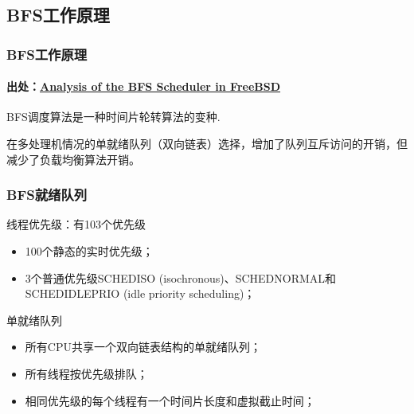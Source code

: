 \subsection{BFS工作原理} %
\begin{frame}[fragile]
    \frametitle{BFS工作原理}
    \framesubtitle{出处：\href{http://vellvisher.github.io/papers_reports/doc/BFS_FreeBSD.pdf}{Analysis of the BFS Scheduler in FreeBSD}}
    BFS调度算法是一种时间片轮转算法的变种.
    \begin{figure}
    \end{figure} \pause

在多处理机情况的单就绪队列（双向链表）选择，增加了队列互斥访问的开销，但减少了负载均衡算法开销。

\end{frame}
% 
% 
% 
% 
% 
% 
% 
\begin{frame}[fragile]
    \frametitle{BFS就绪队列}
    \begin{block}{线程优先级：有103个优先级}
	    \begin{itemize}
	        \item 100个静态的实时优先级；
	        \item 3个普通优先级SCHEDISO (isochronous)、SCHEDNORMAL和SCHEDIDLEPRIO (idle priority scheduling)；
	    \end{itemize}
    \end{block} \pause
    \begin{block}{单就绪队列}
	    \begin{itemize}
	        \item 所有CPU共享一个双向链表结构的单就绪队列；
	        \item 所有线程按优先级排队；
	        \item 相同优先级的每个线程有一个时间片长度和虚拟截止时间；
	    \end{itemize}
    \end{block}
\end{frame}
% 
% 

